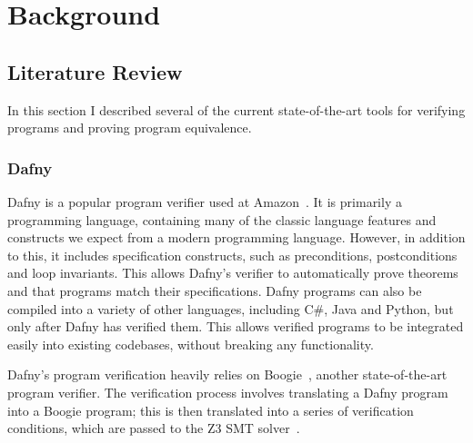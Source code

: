 \chapter{Background}\label{chp:background}

\section{Literature Review}\label{sec:literature-review}

In this section I described several of the current state-of-the-art tools for verifying programs and proving program equivalence.

\subsection{Dafny}\label{sec:dafny}

Dafny is a popular program verifier used at Amazon~\cite{leinoDafnyAutomaticProgram2010}. It is primarily a programming language, containing many of the classic language features and constructs we expect from a modern programming language. However, in addition to this, it includes specification constructs, such as preconditions, postconditions and loop invariants. This allows Dafny's verifier to automatically prove theorems and that programs match their specifications. Dafny programs can also be compiled into a variety of other languages, including C\#, Java and Python, but only after Dafny has verified them. This allows verified programs to be integrated easily into existing codebases, without breaking any functionality.

Dafny's program verification heavily relies on Boogie~\cite{10.1007/11804192_17}, another state-of-the-art program verifier. The verification process involves translating a Dafny program into a Boogie program; this is then translated into a series of verification conditions, which are passed to the Z3 SMT solver~\cite{10.1007/978-3-540-78800-3_24}. 

